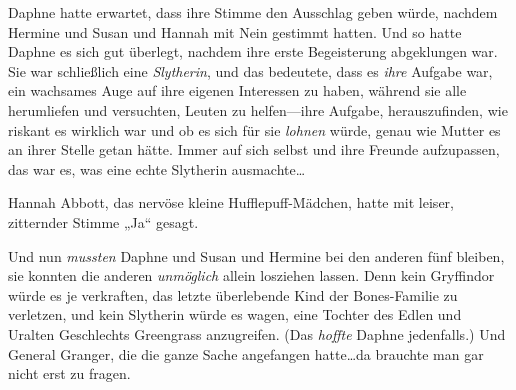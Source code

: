 Daphne hatte erwartet, dass ihre Stimme den Ausschlag geben würde, nachdem Hermine und Susan und Hannah mit Nein gestimmt hatten. Und so hatte Daphne es sich gut überlegt, nachdem ihre erste Begeisterung abgeklungen war. Sie war schließlich eine \emph{Slytherin}, und das bedeutete, dass es \emph{ihre} Aufgabe war, ein wachsames Auge auf ihre eigenen Interessen zu haben, während sie alle herumliefen und versuchten, Leuten zu helfen—ihre Aufgabe, herauszufinden, wie riskant es wirklich war und ob es sich für sie \emph{lohnen} würde, genau wie Mutter es an ihrer Stelle getan hätte. Immer auf sich selbst und ihre Freunde aufzupassen, das war es, was eine echte Slytherin ausmachte…

Hannah Abbott, das nervöse kleine Hufflepuff-Mädchen, hatte mit leiser, zitternder Stimme „Ja“ gesagt.

Und nun \emph{mussten} Daphne und Susan und Hermine bei den anderen fünf bleiben, sie konnten die anderen \emph{unmöglich} allein losziehen lassen. Denn kein Gryffindor würde es je verkraften, das letzte überlebende Kind der Bones-Familie zu verletzen, und kein Slytherin würde es wagen, eine Tochter des Edlen und Uralten Geschlechts Greengrass anzugreifen. (Das \emph{hoffte} Daphne jedenfalls.) Und General Granger, die die ganze Sache angefangen hatte…da brauchte man gar nicht erst zu fragen.

